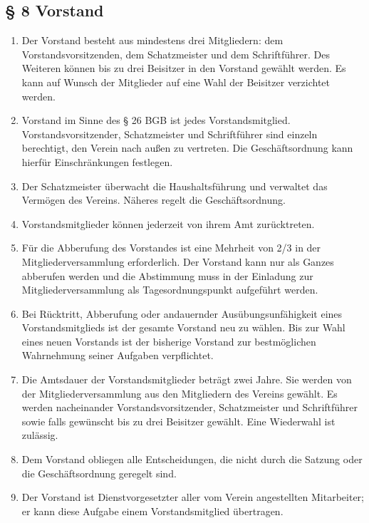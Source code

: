 ﻿\documentclass[10pt,a4paper]{scrartcl}
\begin{document}
\subsection*{§ 8 Vorstand }
\begin{enumerate}

    \item Der Vorstand besteht aus mindestens drei Mitgliedern: dem
    Vorstandsvorsitzenden, dem Schatzmeister und dem Schriftführer. Des
    Weiteren können bis zu drei Beisitzer in den Vorstand gewählt werden. Es
    kann auf Wunsch der Mitglieder auf eine Wahl der Beisitzer verzichtet
    werden.
    \item Vorstand im Sinne des § 26 BGB ist jedes Vorstandsmitglied.
    Vorstandsvorsitzender, Schatzmeister und Schriftführer sind einzeln
    berechtigt, den Verein nach außen zu vertreten. Die Geschäftsordnung kann
    hierfür Einschränkungen festlegen.
        \item Der Schatzmeister über\-wacht die Haushaltsführung und verwaltet das
                Ver\-mö\-gen des Vereins. Nä\-her\-es regelt die Ge\-schäfts\-ord\-nung.
        \item Vorstandsmitglieder können jederzeit von ihrem Amt zurücktreten.
        \item Für die Abberufung des Vorstandes ist eine Mehrheit von 2/3 in der Mitgliederversammlung erforderlich. Der Vorstand kann nur als Ganzes abberufen werden und die Abstimmung muss in der Einladung zur Mitgliederversammlung als Tagesordnungspunkt aufgeführt werden.
        \item Bei Rücktritt, Abberufung oder andauernder Ausübungsunfähigkeit eines Vorstandsmitglieds ist
                der gesamte Vorstand neu zu wählen. Bis zur Wahl eines neuen Vorstands ist der
                bisherige Vorstand zur bestmöglichen Wahrnehmung seiner Aufgaben verpflichtet.
    \item Die Amtsdauer der Vorstandsmitglieder beträgt zwei Jahre. Sie werden
    von der Mitgliederversammlung aus den Mitgliedern des Vereins gewählt. Es
    werden nacheinander Vorstandsvorsitzender, Schatzmeister und Schriftführer
    sowie falls gewünscht bis zu drei Beisitzer gewählt. Eine Wiederwahl ist
    zulässig.
    \item Dem Vorstand obliegen alle Entscheidungen, die nicht durch die Satzung oder die Geschäftsordnung geregelt sind.
        \item Der Vorstand ist Dienstvorgesetzter aller vom Verein angestellten Mitarbeiter;
                er kann diese Aufgabe einem Vorstandsmitglied übertragen.

\end{enumerate}
\end{document}
